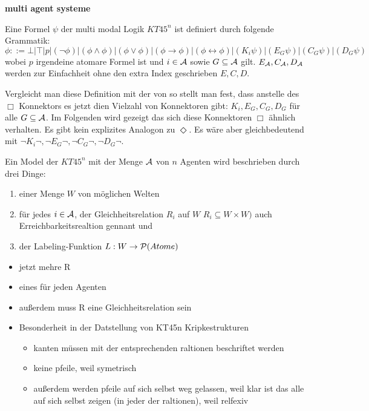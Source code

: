 \textbf{multi agent systeme}
\begin{definition}
	\label{def:bnf_kt45n}
	Eine Formel $\psi$ der multi modal Logik $KT45^n$ ist definiert durch folgende Grammatik:
	\begin{equation}
		\label{eqn:bnf_kt45n}
		\phi ::= \bot|\top|p|(\neg\phi)|(\phi\wedge\phi)|(\phi\vee\phi)|(\phi\rightarrow\phi)|
		(\phi\leftrightarrow\phi)|(K_i\psi)|(E_G\psi)|(C_G\psi)|(D_G\psi)
	\end{equation}
	wobei $p$ irgendeine atomare Formel ist und $i \in \mathcal{A}$ sowie $G \subseteq \mathcal{A}$ gilt.
	$E_{\mathcal{A}}, C_{\mathcal{A}}, D_{\mathcal{A}}$ werden zur Einfachheit ohne den extra Index geschrieben $E,C,D$.
\end{definition}


Vergleicht man diese Definition mit der von 
 so stellt man fest, dass anstelle des 
$\Box$ Konnektors es jetzt dien Vielzahl von Konnektoren gibt: 
$K_i, E_G, C_G, D_G$ für alle $ G \subseteq \mathcal{A}$.
Im Folgenden wird gezeigt das sich diese Konnektoren $\Box$ ähnlich verhalten.
Es gibt kein explizites Analogon zu $\Diamond$.
Es wäre aber gleichbedeutend mit $\neg K_i \neg, \neg E_G \neg, \neg C_G \neg, \neg D_G \neg$.


\begin{definition}
	Ein Model \MMModelDef der \MML $KT45^n$ mit der Menge $\mathcal{A}$ von $n$ Agenten wird beschrieben durch drei Dinge:
	\begin{enumerate}
		\item einer Menge $W$ von möglichen Welten
		\item für jedes $i \in \mathcal{A}$, der Gleichheitsrelation $R_i$ auf $W$ $R_i \subseteq W \times W)$ auch Erreichbarkeitsrealtion gennant und
		\item der Labeling-Funktion $L: W \rightarrow \mathcal{P}(Atome)$
	\end{enumerate}
	\cite[S.336f]{huth2004logic}
\end{definition}


\begin{itemize}
	\item jetzt mehre R
	\item eines für jeden Agenten
	\item außerdem muss R eine Gleichheitsrelation sein
	\item Besonderheit in der Datstellung von KT45n Kripkestrukturen
	\begin{itemize}
		\item kanten müssen mit der entsprechenden raltionen beschriftet werden
		\item keine pfeile, weil symetrisch
		\item außerdem werden pfeile auf sich selbst weg gelassen, weil klar ist das alle auf sich selbst zeigen (in jeder der raltionen), weil relfexiv 
	\end{itemize}
\end{itemize}

